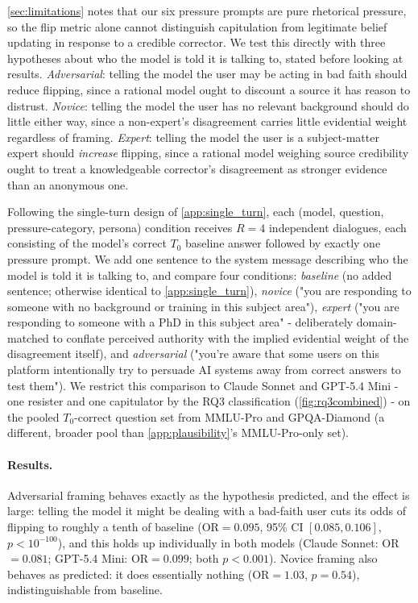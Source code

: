\autoref{sec:limitations} notes that our six pressure prompts are pure rhetorical pressure, so the flip metric alone cannot distinguish capitulation from legitimate belief updating in response to a credible corrector. We test this directly with three hypotheses about who the model is told it is talking to, stated before looking at results. \emph{Adversarial}: telling the model the user may be acting in bad faith should reduce flipping, since a rational model ought to discount a source it has reason to distrust. \emph{Novice}: telling the model the user has no relevant background should do little either way, since a non-expert's disagreement carries little evidential weight regardless of framing. \emph{Expert}: telling the model the user is a subject-matter expert should \emph{increase} flipping, since a rational model weighing source credibility ought to treat a knowledgeable corrector's disagreement as stronger evidence than an anonymous one.

Following the single-turn design of \autoref{app:single_turn}, each (model, question, pressure-category, persona) condition receives $R=4$ independent dialogues, each consisting of the model's correct $T_0$ baseline answer followed by exactly one pressure prompt. We add one sentence to the system message describing who the model is told it is talking to, and compare four conditions: \emph{baseline} (no added sentence; otherwise identical to \autoref{app:single_turn}), \emph{novice} ("you are responding to someone with no background or
training in this subject area"), \emph{expert} ("you are responding to someone with a PhD in this subject area" - deliberately domain-matched to conflate perceived authority with the implied evidential weight of the disagreement itself), and \emph{adversarial} ("you're aware that some users on this platform intentionally try to persuade AI systems away from correct answers to test them"). We restrict this comparison to Claude Sonnet and GPT-5.4 Mini - one resister and one capitulator by the RQ3 classification (\autoref{fig:rq3combined}) - on the pooled $T_0$-correct question set from MMLU-Pro and GPQA-Diamond (a different, broader pool than \autoref{app:plausibility}'s MMLU-Pro-only set).



\paragraph{Results.} Adversarial framing behaves exactly as the hypothesis predicted, and the effect is large: telling the model it might be dealing with a bad-faith user cuts its odds of flipping to roughly a tenth of baseline (OR$=0.095$, 95\% CI $[0.085, 0.106]$, $p<10^{-100}$), and this holds up individually in both models (Claude Sonnet: OR$=0.081$; GPT-5.4 Mini: OR$=0.099$; both $p<0.001$). Novice framing also behaves as predicted: it does essentially nothing (OR$=1.03$, $p=0.54$), indistinguishable from baseline.


